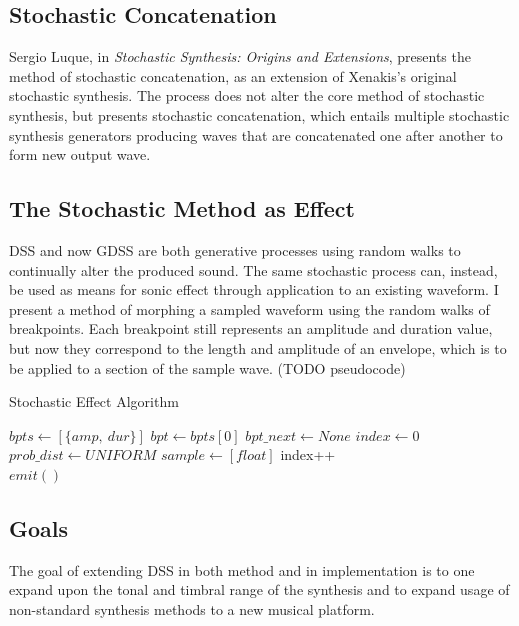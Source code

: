 \documentclass[10pt]{article}
\begin{document}
\subsection{Stochastic Concatenation}
Sergio Luque, in \textit{Stochastic Synthesis: Origins and Extensions}, presents the method of stochastic concatenation, as an extension of Xenakis's original stochastic synthesis.\citep{sergio2006} The process does not alter the core method of stochastic synthesis, but presents stochastic concatenation, which entails multiple stochastic synthesis generators producing waves that are concatenated one after another to form new output wave. 

\subsection{The Stochastic Method as Effect}
DSS and now GDSS are both generative processes using random walks to continually alter the produced sound. The same stochastic process can, instead, be used as means for sonic effect through application to an existing waveform. I present a method of morphing a sampled waveform using the random walks of breakpoints. Each breakpoint still represents an amplitude and duration value, but now they correspond to the length and amplitude of an envelope, which is to be applied to a section of the sample wave. (TODO pseudocode)

\begin{algorithm}
\caption{Stochastic Effect Algorithm}
    \begin{algorithmic}
        \STATE $bpts\gets [\{amp,\ dur\}]$
        \STATE $bpt\gets bpts[0]$
        \STATE $bpt\_next\gets None$
        \STATE $index\gets 0$
        \STATE $prob\_dist\gets UNIFORM$
        \STATE $sample\gets [float]$
        \LOOP
                \STATE index++\\
            \ENDIF
            \STATE $emit()$
        \ENDLOOP
    \end{algorithmic}
\end{algorithm}

\subsection{Goals}
The goal of extending DSS in both method and in implementation is to one expand upon the tonal and timbral range of the synthesis and to expand usage of non-standard synthesis methods to a new musical platform. 
\end{document}
